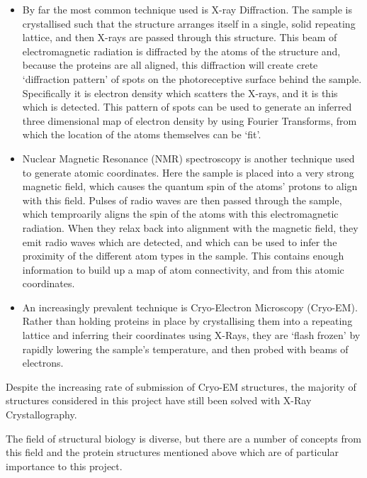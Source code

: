 \begin{itemize}

\item By far the most common technique used is X-ray Diffraction. The sample is crystallised such that the structure arranges itself in a single, solid repeating lattice, and then X-rays are passed through this structure. This beam of electromagnetic radiation is diffracted by the atoms of the structure and, because the proteins are all aligned, this diffraction will create  crete `diffraction pattern' of spots on the photoreceptive surface behind the sample. Specifically it is electron density which scatters the X-rays, and it is this which is detected. This pattern of spots can be used to generate an inferred three dimensional map of electron density by using Fourier Transforms, from which the location of the atoms themselves can be `fit'.

\item Nuclear Magnetic Resonance (NMR) spectroscopy is another technique used to generate atomic coordinates. Here the sample is placed into a very strong magnetic field, which causes the quantum spin of the atoms' protons to align with this field. Pulses of radio waves are then passed through the sample, which temproarily aligns the spin of the atoms with this electromagnetic radiation. When they relax back into alignment with the magnetic field, they emit radio waves which are detected, and which can be used to infer the proximity of the different atom types in the sample. This contains enough information to build up a map of atom connectivity, and from this atomic coordinates.

\item An increasingly prevalent technique is Cryo-Electron Microscopy (Cryo-EM). Rather than holding proteins in place by crystallising them into a repeating lattice and inferring their coordinates using X-Rays, they are `flash frozen' by rapidly lowering the sample's temperature, and then probed with beams of electrons.

\end{itemize}

Despite the increasing rate of submission of Cryo-EM structures, the majority of structures considered in this project have still been solved with X-Ray Crystallography.

The field of structural biology is diverse, but there are a number of concepts from this field and the protein structures mentioned above which are of particular importance to this project.

